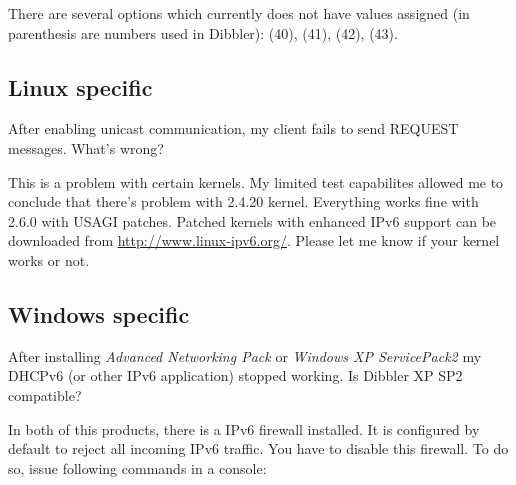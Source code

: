 There are several options which currently does not have values
assigned (in parenthesis are numbers used in Dibbler):
 (40),  (41),  (42),
 (43).

\subsection{Linux specific}

\Q After enabling unicast communication, my client fails to send
REQUEST messages. What's wrong?

\A This is a problem with certain kernels. My limited test capabilites
allowed me to conclude that there's problem with 2.4.20
kernel. Everything works fine with 2.6.0 with USAGI patches. Patched 
kernels with enhanced IPv6 support can be downloaded from
\url{http://www.linux-ipv6.org/}. Please let me know if your kernel
works or not.

\subsection{Windows specific}

\Q After installing \emph{Advanced Networking Pack} or \emph{Windows XP
  ServicePack2} my DHCPv6 (or other IPv6 application) stopped
   working. Is Dibbler XP SP2 compatible?

\A In both of this products, there is a IPv6 firewall installed. It
is configured by default to reject all incoming IPv6 traffic. You have
to disable this firewall. To do so, issue following commands in a
console:

\begin{verbatim}

\end{verbatim}

